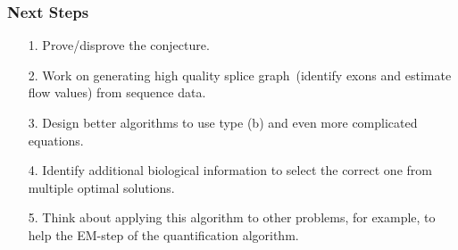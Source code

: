 \frame
{
	\frametitle{Next Steps}

	\begin{itemize}
	\item[1.] Prove/disprove the conjecture.
	\vspace{0.3cm}
	\item[2.] Work on generating high quality splice graph~(identify exons and estimate
			flow values) from sequence data.
	\vspace{0.3cm}
	\item[3.] Design better algorithms to use type (b) and even more complicated equations.
	\vspace{0.3cm}
	\item[4.] Identify additional biological information to select the correct one from 
		multiple optimal solutions.
	\vspace{0.3cm}
	\item[5.] Think about applying this algorithm to other problems, for example, to
		help the EM-step of the quantification algorithm.
	\end{itemize}
}
